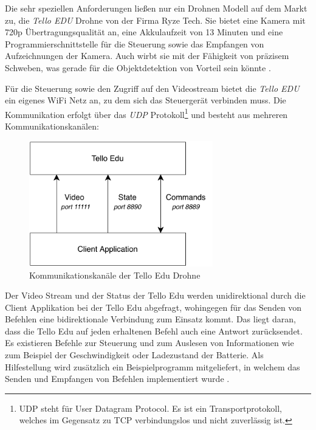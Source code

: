 Die sehr speziellen Anforderungen ließen nur ein Drohnen Modell auf dem Markt zu, die \textit{Tello EDU} Drohne von der Firma Ryze Tech. Sie bietet eine Kamera mit 720p Übertragungsqualität an, eine Akkulaufzeit von 13 Minuten und eine Programmierschnittstelle für die Steuerung sowie das Empfangen von Aufzeichnungen der Kamera. Auch wirbt sie mit der Fähigkeit von präzisem Schweben, was gerade für die Objektdetektion von Vorteil sein könnte \cite{RyzeRobotics.2020}.

Für die Steuerung sowie den Zugriff auf den Videostream bietet die \textit{Tello EDU} ein eigenes WiFi Netz an, zu dem sich das Steuergerät verbinden muss. Die Kommunikation erfolgt über das \textit{UDP} Protokoll\footnote{UDP steht für User Datagram Protocol. Es ist ein Transportprotokoll, welches im Gegensatz zu TCP verbindungslos und nicht zuverlässig ist.} und besteht aus mehreren Kommunikationskanälen: 

\begin{figure}[H]
	\begin{center}
		\includegraphics[width=8cm]{Bilder/communication_tello.pdf} 
		\caption{Kommunikationskanäle der Tello Edu Drohne}
		\label{communication_tello}
	\end{center}
\end{figure}

Der Video Stream und der Status der Tello Edu werden unidirektional durch die Client Applikation bei der Tello Edu abgefragt, wohingegen für das Senden von Befehlen eine bidirektionale Verbindung zum Einsatz kommt. Das liegt daran, dass die Tello Edu auf jeden erhaltenen Befehl auch eine Antwort zurücksendet. Es existieren Befehle zur Steuerung und zum Auslesen von Informationen wie zum Beispiel der Geschwindigkeit oder Ladezustand der Batterie. Als Hilfestellung wird zusätzlich ein Beispielprogramm mitgeliefert, in welchem das Senden und Empfangen von Befehlen implementiert wurde \cite{RyzeTech.2018}. 